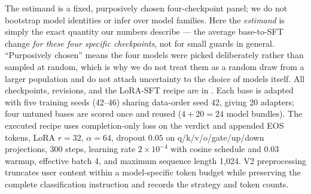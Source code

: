 \documentclass[11pt]{article}
\begin{document}
The estimand is a fixed, purposively chosen four-checkpoint panel; we do not bootstrap model identities or infer over model families. Here the \emph{estimand} is simply the exact quantity our numbers describe --- the average base-to-SFT change \emph{for these four specific checkpoints}, not for small guards in general. ``Purposively chosen'' means the four models were picked deliberately rather than sampled at random, which is why we do not treat them as a random draw from a larger population and do not attach uncertainty to the choice of models itself. All checkpoints, revisions, and the LoRA-SFT recipe are in . Each base is adapted with five training seeds (42--46) sharing data-order seed 42, giving 20 adapters; four untuned bases are scored once and reused ($4+20=24$ model bundles). The executed recipe uses completion-only loss on the verdict and appended EOS tokens, LoRA $r{=}32$, $\alpha{=}64$, dropout $0.05$ on q/k/v/o/gate/up/down projections, 300 steps, learning rate $2\times10^{-4}$ with cosine schedule and 0.03 warmup, effective batch 4, and maximum sequence length 1{,}024. V2 preprocessing truncates user content within a model-specific token budget while preserving the complete classification instruction and records the strategy and token counts.

\begin{table}[!htbp]
\centering
\small
\caption{Fixed model panel and executed clean-v2 LoRA-SFT recipe. Revisions are pinned and decision tokens are verified as distinct single tokens. Training-token and wall-time values are medians across five runs. Every run records the A100 device, peak memory, exact software/runtime versions, truncation statistics, and per-run timing.}
\label{tab:panel-recipe}
\end{table}
\end{document}
